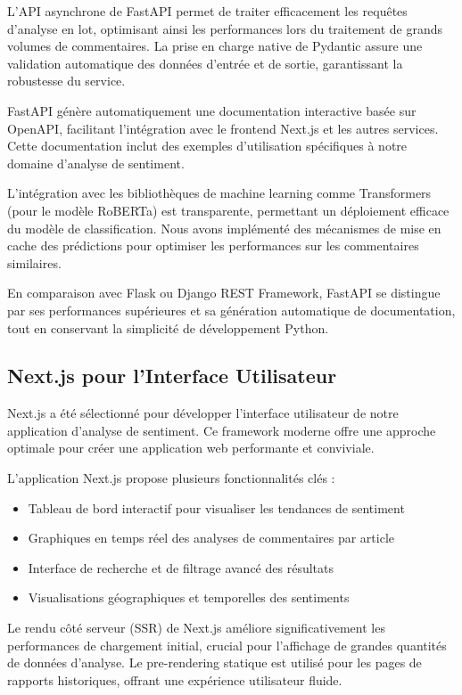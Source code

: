 L'API asynchrone de FastAPI permet de traiter efficacement les requêtes d'analyse en lot, optimisant ainsi les performances lors du traitement de grands volumes de commentaires. La prise en charge native de Pydantic assure une validation automatique des données d'entrée et de sortie, garantissant la robustesse du service.

FastAPI génère automatiquement une documentation interactive basée sur OpenAPI, facilitant l'intégration avec le frontend Next.js et les autres services. Cette documentation inclut des exemples d'utilisation spécifiques à notre domaine d'analyse de sentiment.

L'intégration avec les bibliothèques de machine learning comme Transformers (pour le modèle RoBERTa) est transparente, permettant un déploiement efficace du modèle de classification. Nous avons implémenté des mécanismes de mise en cache des prédictions pour optimiser les performances sur les commentaires similaires.

En comparaison avec Flask ou Django REST Framework, FastAPI se distingue par ses performances supérieures et sa génération automatique de documentation, tout en conservant la simplicité de développement Python.

\subsection{Next.js pour l'Interface Utilisateur}
Next.js a été sélectionné pour développer l'interface utilisateur de notre application d'analyse de sentiment. Ce framework moderne offre une approche optimale pour créer une application web performante et conviviale.

L'application Next.js propose plusieurs fonctionnalités clés :
\begin{itemize}
    \item Tableau de bord interactif pour visualiser les tendances de sentiment
    \item Graphiques en temps réel des analyses de commentaires par article
    \item Interface de recherche et de filtrage avancé des résultats
    \item Visualisations géographiques et temporelles des sentiments
\end{itemize}

Le rendu côté serveur (SSR) de Next.js améliore significativement les performances de chargement initial, crucial pour l'affichage de grandes quantités de données d'analyse. Le pre-rendering statique est utilisé pour les pages de rapports historiques, offrant une expérience utilisateur fluide.

